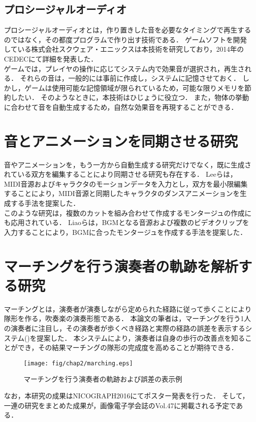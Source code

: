 \subsection{プロシージャルオーディオ}
プロシージャルオーディオとは，作り置きした音を必要なタイミングで再生するのではなく，その都度プログラムで作り出す技術である．
ゲームソフトを開発している株式会社スクウェア・エニックスは本技術を研究しており，2014年のCEDECにて詳細\cite{SQUARE}を発表した．\\
\indent
ゲームでは，プレイヤの操作に応じてシステム内で効果音が選択され，再生される．
それらの音は，一般的には事前に作成し，システムに記憶させておく．
しかし，ゲームは使用可能な記憶領域が限られているため，可能な限りメモリを節約したい．
そのようなときに，本技術はひじょうに役立つ．
また，物体の挙動に合わせて音を自動生成するため，自然な効果音を再現することができる．

\section{音とアニメーションを同期させる研究} \label{sec:synchronization}
音やアニメーションを，もう一方から自動生成する研究だけでなく，既に生成されている双方を編集することにより同期させる研究も存在する．
Leeら\cite{Lee}は，MIDI音源およびキャラクタのモーションデータを入力とし，双方を最小限編集することにより，MIDI音源と同期したキャラクタのダンスアニメーションを生成する手法を提案した．\\
\indent
このような研究は，複数のカットを組み合わせて作成するモンタージュの作成にも応用されている．
Liaoら\cite{Liao}は，BGMとなる音源および複数のビデオクリップを入力することにより，BGMに合ったモンタージュを作成する手法を提案した．

\section{マーチングを行う演奏者の軌跡を解析する研究} \label{sec:marching}
マーチングとは，演奏者が演奏しながら定められた経路に従って歩くことにより隊形を作る，吹奏楽の演奏形態である．
本論文の筆者は，マーチングを行う1人の演奏者に注目し，その演奏者が歩くべき経路と実際の経路の誤差を表示するシステム()を提案した．
本システムにより，演奏者は自身の歩行の改善点を知ることができ，その結果マーチングの隊形の完成度を高めることが期待できる．
\begin{figure}[h]
	\centering
	\texttt{[image: fig/chap2/marching.eps]}
	\caption{マーチングを行う演奏者の軌跡および誤差の表示例}
	\label{fig:marching}
\end{figure}
なお，本研究の成果はNICOGRAPH2016にてポスター発表\cite{nicograph}を行った．
そして，一連の研究をまとめた成果が，画像電子学会誌のVol.47\cite{iieej}に掲載される予定である．

